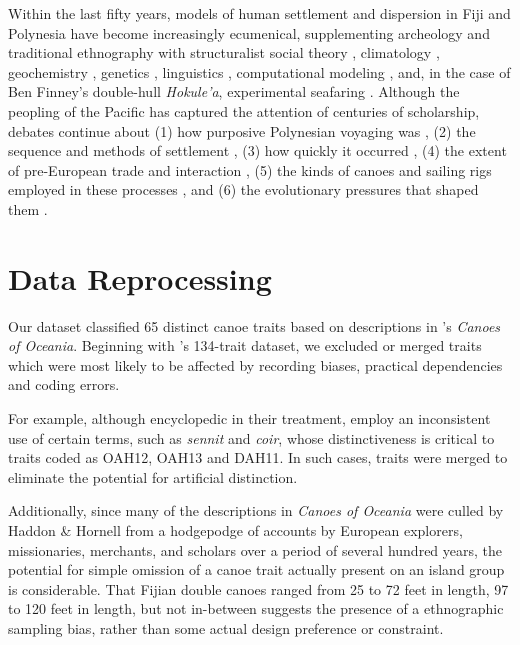 \documentclass[11pt]{article}
\begin{document}
Within the last fifty years, models of human settlement and dispersion in Fiji and Polynesia have become increasingly ecumenical, supplementing archeology and traditional ethnography \citep{Anderson2006motivation,Feinberg1988seafaring} with structuralist social theory \citep{Sahlins1985:History}, climatology \citep{Anderson2006ENSO}, geochemistry \citep{Collerson2007adze}, genetics \citep{MatisooSmith2004:PacificRatDNA, Whyte2005:PolyHumanEvol, Friedlaender2008:PacificGenetics}, linguistics \citep{Greenhill2005:DispersalTrees}, computational modeling \citep{DiPiazza2007virtualcanoes, Avis2007discovery}, and, in the case of Ben Finney's double-hull \textit{Hokule'a}, experimental seafaring \citep{Finney1994:Rediscovery}. Although the peopling of the Pacific has captured the attention of centuries of scholarship, debates continue about (1) how purposive Polynesian voyaging was \citep{Whyte2005:PolyHumanEvol}, (2) the sequence and methods of settlement \citep{Irwin1992}, (3) how quickly it occurred \citep{Anderson2000:Slowboats, Thomas2008:Lastpulse, Gray2009:Phylogenies}, (4) the extent of pre-European trade and interaction  \citep{Weisler1998}, (5) the kinds of canoes and sailing rigs employed in these processes \citep{Doran1981canoes, Anderson2001:SharpEnd}, and (6) the evolutionary pressures that shaped them \citep{Horridge1987:IndonesiaCanoes}.

\section{Data Reprocessing}

Our dataset classified 65 distinct canoe traits based on descriptions in \cite{HaddonHornell1936}'s \textit{Canoes of Oceania}. Beginning with \cite{rogers2008:Canoes}'s 134-trait dataset, we excluded or merged traits which were most likely to be affected by recording biases, practical dependencies and coding errors.

For example, although encyclopedic in their treatment, \cite{HaddonHornell1936} employ an inconsistent use of certain terms, such as \textit{sennit} and \textit{coir}, whose distinctiveness is critical to traits coded as OAH12, OAH13 and DAH11. In such cases, traits were merged to eliminate the potential for artificial distinction. 

Additionally, since many of the descriptions in \textit{Canoes of Oceania} were culled by Haddon \& Hornell from a hodgepodge of accounts by European explorers, missionaries, merchants, and scholars over a period of several hundred years, the potential for simple omission of a canoe trait actually present on an island group is considerable. That Fijian double canoes ranged from 25 to 72 feet in length, 97 to 120 feet in length, but not in-between suggests the presence of a ethnographic sampling bias, rather than some actual design preference or constraint. 
\end{document}
